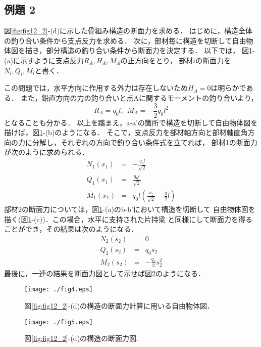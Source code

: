 ﻿\documentclass[10pt,a4j]{jbook}
\begin{document}
\subsection{例題 2}
図\ref{fig:fig12_2}-(d)に示した骨組み構造の断面力を求める．
はじめに，構造全体の釣り合い条件から支点反力を求める．
次に，部材毎に構造を切断して自由物体図を描き，部分構造の釣り合い条件から断面力を決定する．
以下では，
図\ref{fig:fig12_4}-(a)に示すように支点反力$R_A,H_A,M_A$の正方向をとり，
部材$i$の断面力を$N_i, Q_i, M_i$と書く．

この問題では，水平方向に作用する外力は存在しないため$H_A=0$は明らかである．
また，鉛直方向の力の釣り合いと点Aに関するモーメントの釣り合いより，
\begin{equation}
	R_A=q_0l, \ \ M_A=-\frac{3}{2}q_0l^2
\end{equation}
となることも分かる．
以上を踏まえ，a-a'の箇所で構造を切断して自由物体図を描けば，図\ref{fig:fig12_4}-(b)のようになる．
そこで，支点反力を部材軸方向と部材軸直角方向の力に分解し，それぞれの方向で釣り合い条件式を立てれば，
部材1の断面力が次のように求められる．
\begin{eqnarray}
	N_1(x_1) &= & -\frac{q_0l}{\sqrt{2}} 
	\\
	Q_1(x_1) &= & \frac{q_0l}{\sqrt{2}} 
	\\
	M_1(x_1) &= & q_0l \left( \frac{x_1}{\sqrt{2}}-\frac{3}{2}l\right) 
\end{eqnarray}
部材2の断面力については，図\ref{fig:fig12_4}-(a)のb-b'において構造を切断して
自由物体図を描く(図\ref{fig:fig12_4}-(c))．この場合，水平に支持された片持梁
と同様にして断面力を得ることができ，その結果は次のようになる．
\begin{eqnarray}
	N_2(s_2) &= & 0
	\\
	Q_2(s_2) &= & q_0s_2
	\\
	M_2(s_2) &= & -\frac{q_0}{2}s_2^2
\end{eqnarray}
最後に，一連の結果を断面力図として示せば図\ref{fig:fig12_5}のようになる．
\begin{figure}[h]
	\begin{center}
	\texttt{[image: ./fig4.eps]} 
	\end{center}
	\caption{
		図\ref{fig:fig12_2}-(d)の構造の断面力計算に用いる自由物体図．
	} 
	\label{fig:fig12_4}
\end{figure}
\begin{figure}[h]
	\begin{center}
	\texttt{[image: ./fig5.eps]} 
	\end{center}
	\caption{
		図\ref{fig:fig12_2}-(d)の構造の断面力図.
	} 
	\label{fig:fig12_5}
\end{figure}
\end{document}
